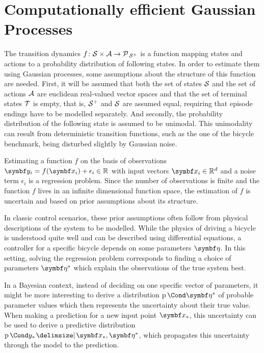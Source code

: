 \chapter{Computationally efficient Gaussian Processes}
\label{toc:gp}
The transition dynamics $f \colon \mathcal{S} \times \mathcal{A} \to \operatorname{\mathcal{P}\mkern2mu}_{\mathcal{S}^+}$ is a function mapping states and actions to a probability distribution of following states.
In order to estimate them using Gaussian processes, some assumptions about the structure of this function are needed.
First, it will be assumed that both the set of states $\mathcal{S}$ and the set of actions $\mathcal{A}$ are euclidean real-valued vector spaces and that the set of terminal states $\mathcal{T}$ is empty, that is, $\mathcal{S}^+$ and $\mathcal{S}$ are assumed equal, requiring that episode endings have to be modelled separately.
And secondly, the probability distribution of the following state is assumed to be unimodal.
This unimodality can result from deterministic transition functions, such as the one of the bicycle benchmark, being disturbed slightly by Gaussian noise.

Estimating a function $f$ on the basis of observations $\mat{y_i} = f(\mat{x_i}) + \epsilon_i \in \Rb$ with input vectors $\mat{x_i} \in \Rb^d$ and a noise term $\epsilon_i$ is a regression problem.
Since the number of observations is finite and the function $f$ lives in an infinite dimensional function space, the estimation of $f$ is uncertain and based on prior assumptions about its structure.

In classic control scenarios, these prior assumptions often follow from physical descriptions of the system to be modelled.
While the physics of driving a bicycle is understood quite well and can be described using differential equations, a controller for a specific bicycle depends on some parameters $\rv{\eta}$.
In this setting, solving the regression problem corresponds to finding a choice of parameters $\rv{\eta^\ast}$ which explain the observations of the true system best.

In a Bayesian context, instead of deciding on one specific vector of parameters, it might be more interesting to derive a distribution $\Prob{\rv{\eta^\ast}}$ of probable parameter values which then represents the uncertainty about their true value.
When making a prediction for a new input point $\mat{x_\ast}$, this uncertainty can be used to derive a predictive distribution $\Prob{y_\ast \given \mat{x_\ast}, \mat{\eta^\ast}}$, which propagates this uncertainty through the model to the prediction.

